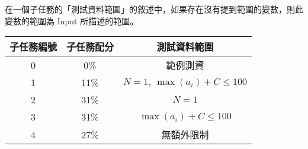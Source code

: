\documentclass[11pt,a4paper]{article}
\begin{document}
在一個子任務的「測試資料範圍」的敘述中，如果存在沒有提到範圍的變數，則此變數的範圍為 Input 所描述的範圍。

\begin{center}
 \begin{tabular}{||c c c||} 
 \hline
 子任務編號 & 子任務配分 & 測試資料範圍 \\  
 \hline
 \hline
 0 & 0\% & 範例測資 \\ 
 \hline
 1 & 11\% & $N =  1,\ \max(a_i) + C \le 100 $ \\
 \hline 
 2 & 31\% & $N = 1$ \\
 \hline
 3 & 31\% & $\max(a_i) + C \le 100$ \\
 \hline
 4 & 27\% & 無額外限制 \\
 \hline

\end{tabular}
\end{center}
\end{document}
